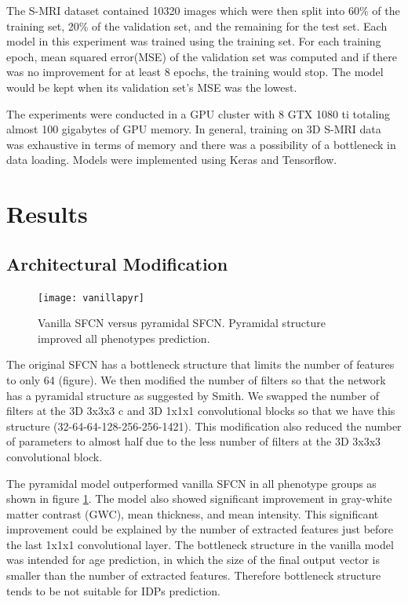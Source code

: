 \documentclass{article}
\begin{document}
    The S-MRI dataset contained 10320 images which were then split into 60\% of the training set, 20\% of the validation set, and the remaining for the test set. 
    Each model in this experiment was trained using the training set. 
    For each training epoch, mean squared error(MSE) of the validation set was computed and if there was no improvement for at least 8 epochs, the training would stop. 
    The model would be kept when its validation set’s MSE was the lowest.

    The experiments were conducted in a GPU cluster with 8 GTX 1080 ti totaling almost 100 gigabytes of GPU memory. 
    In general, training on 3D S-MRI data was exhaustive in terms of memory and there was a possibility of a bottleneck in data loading. 
    Models were implemented using Keras and Tensorflow.
    \section*{Results}
    
    \subsection*{Architectural Modification}
    \begin{figure}[h]
        \centering
        \texttt{[image: vanillapyr]}
        \centering
        \caption{
            Vanilla SFCN versus pyramidal SFCN. 
            Pyramidal structure improved all phenotypes prediction.}
        \label{fig:vanillapyr}
    \end{figure}
    The original SFCN has a bottleneck structure that limits the number of features to only 64 (figure). 
    We then modified the number of filters so that the network has a pyramidal structure as suggested by Smith\cite*[]{smith}.  
    We swapped the number of filters at the 3D 3x3x3 c and 3D 1x1x1 convolutional blocks so that we have this structure (32-64-64-128-256-256-1421). 
    This modification also reduced the number of parameters to almost half due to the less number of filters at the 3D 3x3x3 convolutional block.

    The pyramidal model outperformed vanilla SFCN in all phenotype groups as shown in figure \ref{fig:vanillapyr}. 
    The model also showed significant improvement in gray-white matter contrast (GWC), mean thickness, and mean intensity. 
    This significant improvement could be explained by the number of extracted features just before the last 1x1x1 convolutional layer. 
    The bottleneck structure in the vanilla model was intended for age prediction, in which the size of the final output vector is smaller than the number of extracted features. 
    Therefore bottleneck structure tends to be not suitable for IDPs prediction.
\end{document}
